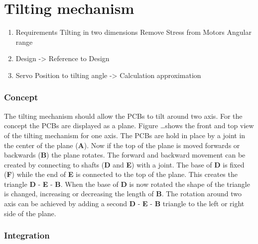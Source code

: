 \section{Tilting mechanism}

\begin{enumerate}
  \item Requirements
  \subitem Tilting in two dimensions
  \subitem Remove Stress from Motors
  \subitem Angular range
  \item Design -> Reference to Design
  \item Servo Position to tilting angle -> Calculation
  \subitem approximation
\end{enumerate}

\subsubsection*{Concept}

The tilting mechanism should allow the PCBs to tilt around two axis. For the concept the PCBs are displayed as a plane. Figure \dots shows the front and top view of the tilting mechanism for one axis.\p
The PCBs are hold in place by a joint in the center of the plane (\textbf{A}). Now if the top of the plane is moved forwards or backwards (\textbf{B}) the plane rotates. The forward and backward movement can be created by connecting to shafts (\textbf{D} and \textbf{E}) with a joint. The base of \textbf{D} is fixed (\textbf{F}) while the end of \textbf{E} is connected to the top of the plane. This creates the triangle \textbf{D} - \textbf{E} - \textbf{B}. When the base of \textbf{D} is now rotated the shape of the triangle is changed, increasing or decreasing the length of \textbf{B}.
The rotation around two axis can be achieved by adding a second \textbf{D} - \textbf{E} - \textbf{B} triangle to the left or right side of the plane.\p
%


\subsubsection*{Integration}